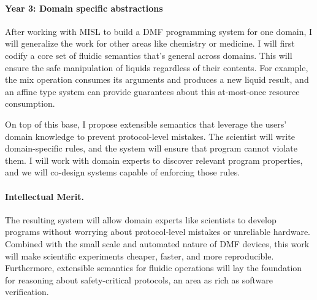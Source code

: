 \documentclass[12pt]{article}
\begin{document}
\paragraph{Year 3: Domain specific abstractions}

After working with MISL to build a DMF programming system for one domain, I will generalize the work for other areas like chemistry or medicine.
I will first codify a core set of fluidic semantics that's general across domains.
This will ensure the safe manipulation of liquids regardless of their contents.
For example, the mix operation consumes its arguments and produces a new liquid result, and an affine type system can provide guarantees about this at-most-once resource consumption.

On top of this base, I propose extensible semantics that leverage the users' domain knowledge to prevent protocol-level mistakes.
The scientist will write domain-specific rules, and the system will ensure that program cannot violate them.
I will work with domain experts to discover relevant program properties, and we will co-design systems capable of enforcing those rules.




\paragraph{Intellectual Merit.}

The resulting system will allow domain experts like scientists to develop programs without worrying about protocol-level mistakes or unreliable hardware.
Combined with the small scale and automated nature of DMF devices, this work will make scientific experiments cheaper, faster, and more reproducible.
Furthermore, extensible semantics for fluidic operations will lay the foundation for reasoning about safety-critical protocols, an area as rich as software verification.
\end{document}
